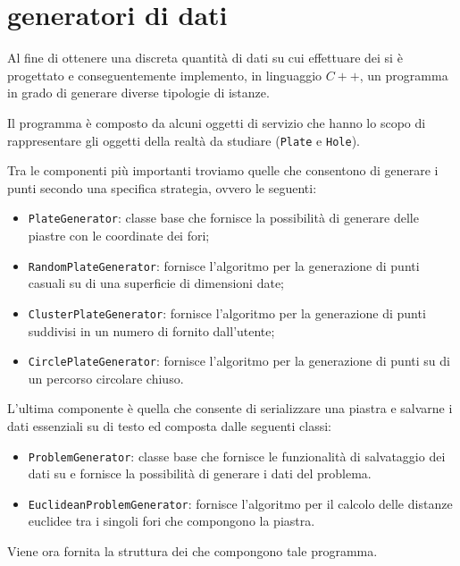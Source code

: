 %
%
\section[Generatori di dati]{generatori di dati}
\label{pt1:generator}
Al fine di ottenere una discreta quantità di dati su cui effettuare dei  si è progettato e conseguentemente implemento, in linguaggio $C++$,
un programma in grado di generare diverse tipologie di istanze.

Il programma è composto da alcuni oggetti di servizio che hanno lo scopo di rappresentare gli oggetti della realtà da studiare (\texttt{Plate} e \texttt{Hole}).

Tra le componenti più importanti troviamo quelle che consentono di generare i punti secondo una specifica strategia, ovvero le seguenti:

\begin{itemize}
\item\texttt{PlateGenerator}: classe base che fornisce la possibilità di generare delle piastre con le coordinate dei fori;
\item\texttt{RandomPlateGenerator}: fornisce l'algoritmo per la generazione di punti casuali su di una superficie di dimensioni date;
\item\texttt{ClusterPlateGenerator}: fornisce l'algoritmo per la generazione di punti suddivisi in un numero di  fornito dall'utente;
\item\texttt{CirclePlateGenerator}: fornisce l'algoritmo per la generazione di punti su di un percorso circolare chiuso.
\end{itemize}

L'ultima componente è quella che consente di serializzare una piastra e salvarne i dati essenziali su  di testo ed composta dalle seguenti classi:

\begin{itemize}
\item\texttt{ProblemGenerator}: classe base che fornisce le funzionalità di salvataggio dei dati su  e fornisce la possibilità di generare i dati del problema.
\item\texttt{EuclideanProblemGenerator}: fornisce l'algoritmo per il calcolo delle distanze euclidee tra i singoli fori che compongono la piastra.
\end{itemize}

Viene ora fornita la struttura dei  che compongono tale programma.


